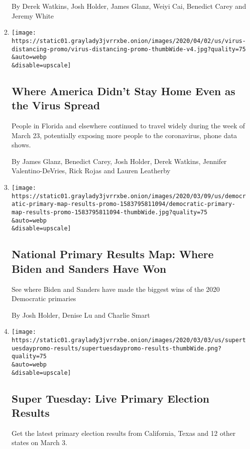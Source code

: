 \begin{enumerate}
  By Derek Watkins, Josh Holder, James Glanz, Weiyi Cai, Benedict Carey
  and Jeremy White
\item
  \href{/interactive/2020/04/02/us/coronavirus-social-distancing.html}{}

  \texttt{[image: https://static01.graylady3jvrrxbe.onion/images/2020/04/02/us/virus-distancing-promo/virus-distancing-promo-thumbWide-v4.jpg?quality=75\\\&auto=webp\\\&disable=upscale]}

  \hypertarget{where-america-didnt-stay-home-even-as-the-virus-spread}{%
  \subsection{Where America Didn't Stay Home Even as the Virus
  Spread}\label{where-america-didnt-stay-home-even-as-the-virus-spread}}

  People in Florida and elsewhere continued to travel widely during the
  week of March 23, potentially exposing more people to the coronavirus,
  phone data shows.

  By James Glanz, Benedict Carey, Josh Holder, Derek Watkins, Jennifer
  Valentino-DeVries, Rick Rojas and Lauren Leatherby
\item
  \href{/interactive/2020/us/elections/democratic-primary-map-results.html}{}

  \texttt{[image: https://static01.graylady3jvrrxbe.onion/images/2020/03/09/us/democratic-primary-map-results-promo-1583795811094/democratic-primary-map-results-promo-1583795811094-thumbWide.jpg?quality=75\\\&auto=webp\\\&disable=upscale]}

  \hypertarget{national-primary-results-map-where-biden-and-sanders-have-won}{%
  \subsection{National Primary Results Map: Where Biden and Sanders Have
  Won}\label{national-primary-results-map-where-biden-and-sanders-have-won}}

  See where Biden and Sanders have made the biggest wins of the 2020
  Democratic primaries

  By Josh Holder, Denise Lu and Charlie Smart
\item
  \href{/interactive/2020/03/03/us/elections/results-super-tuesday-primary-election.html}{}

  \texttt{[image: https://static01.graylady3jvrrxbe.onion/images/2020/03/03/us/supertuesdaypromo-results/supertuesdaypromo-results-thumbWide.png?quality=75\\\&auto=webp\\\&disable=upscale]}

  \hypertarget{super-tuesday-live-primary-election-results}{%
  \subsection{Super Tuesday: Live Primary Election
  Results}\label{super-tuesday-live-primary-election-results}}

  Get the latest primary election results from California, Texas and 12
  other states on March 3.
\end{enumerate}

